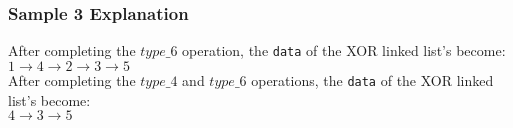 \subsubsection{Sample 3 Explanation}\label{sample-3-explanation}

After completing the $type\_6$ operation, the \texttt{data} of the XOR linked list's become: \\
$1\rightarrow 4\rightarrow 2\rightarrow 3\rightarrow 5$ \\
After completing the $type\_4$ and $type\_6$ operations, the \texttt{data} of the XOR linked list's become: \\
$4\rightarrow 3\rightarrow 5$
